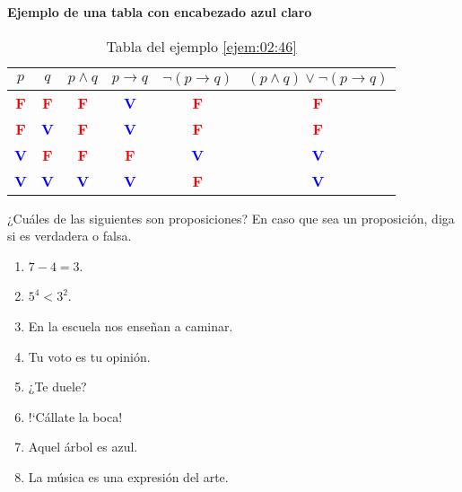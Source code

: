 \textbf{Ejemplo de una tabla con encabezado azul claro}
\begin{table}[H]
\begin{tabular}{c|c|c|c|c|c}
\rowcolor{LightBlue2}$p$ & $q$ & $p\wedge q$ & $p\longrightarrow q$ & $\neg(p\longrightarrow q)$ & $(p\wedge 
q)\vee\neg(p\longrightarrow q)$\\
\toprule
\textcolor{red}{\textbf{F}} & \textcolor{red}{\textbf{F}} & \textcolor{red}{\textbf{F}} & \textcolor{blue}{\textbf{V}} & 
\textcolor{red}{\textbf{F}} & \textcolor{red}{\textbf{F}}\\
\textcolor{red}{\textbf{F}} & \textcolor{blue}{\textbf{V}} & \textcolor{red}{\textbf{F}} & \textcolor{blue}{\textbf{V}} 
& \textcolor{red}{\textbf{F}} & \textcolor{red}{\textbf{F}}\\
\textcolor{blue}{\textbf{V}} & \textcolor{red}{\textbf{F}} & \textcolor{red}{\textbf{F}} & \textcolor{red}{\textbf{F}} & 
\textcolor{blue}{\textbf{V}} & \textcolor{blue}{\textbf{V}}\\
\textcolor{blue}{\textbf{V}} & \textcolor{blue}{\textbf{V}} & \textcolor{blue}{\textbf{V}} & 
\textcolor{blue}{\textbf{V}} & \textcolor{red}{\textbf{F}} & \textcolor{blue}{\textbf{V}}\\ 
\toprule
\end{tabular}
\caption{Tabla del ejemplo \ref{ejem:02:46}}\label{tab:02:07}
\end{table}


\cleardoublepage
{}
\pagestyle{probprop}
\pagecolor{paginaprob}

\begin{prob} ¿Cuáles de las siguientes son proposiciones? En caso que sea un proposición, diga si es verdadera o falsa.
\begin{multicols}{2}
\begin{enumerate}
     \item $7-4=3$.
     \item $5^{4}<3^{2}$.
     \item En la escuela nos enseñan a caminar.
     \item Tu voto es tu opinión.
     \item ¿Te duele?
     \item !`Cállate la boca!
     \item Aquel árbol es azul.
     \item La música es una expresión del arte.
\end{enumerate}
\end{multicols}
\end{prob}

